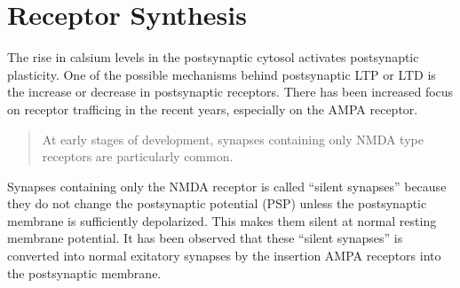 


\section{Receptor Synthesis}
The rise in calsium levels in the postsynaptic cytosol activates postsynaptic plasticity\cite{AMPARtrafficingArtikkel}. 
One of the possible mechanisms behind postsynaptic LTP or LTD is the increase or decrease in postsynaptic receptors. There has been increased focus on receptor trafficing in the recent years, especially on the AMPA receptor. 

\begin{quote}
At early stages of development, synapses containing only NMDA type receptors are particularly common\cite{PrinciplesOfNeuralScience4edKAP12}.
\end{quote}
Synapses containing only the NMDA receptor is called ``silent synapses'' because they do not change the postsynaptic potential (PSP) unless the postsynaptic membrane is sufficiently depolarized. 
This makes them silent at normal resting membrane potential\cite{AMPARtrafficingArtikkel}. 
It has been observed that these ``silent synapses'' is converted into normal exitatory synapses by the insertion AMPA receptors into the postsynaptic membrane\cite{AMPARtrafficingArtikkel}. 

